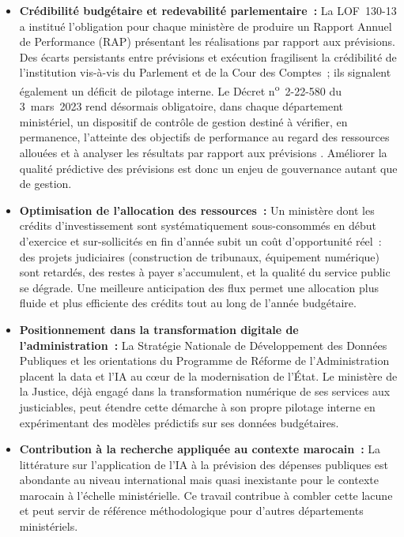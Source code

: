 \begin{itemize}
    \item \textbf{Cr\'edibilit\'e budg\'etaire et redevabilit\'e parlementaire~:}
    La LOF~130-13 a institu\'e l'obligation pour chaque minist\`ere de produire un Rapport Annuel de Performance (RAP) pr\'esentant les r\'ealisations par rapport aux pr\'evisions. Des \'ecarts persistants entre pr\'evisions et ex\'ecution fragilisent la cr\'edibilit\'e de l'institution vis-\`a-vis du Parlement et de la Cour des Comptes~; ils signalent \'egalement un d\'eficit de pilotage interne. Le D\'ecret n\textsuperscript{o}~2-22-580 du 3~mars~2023 rend d\'esormais obligatoire, dans chaque d\'epartement minist\'eriel, un dispositif de contr\^ole de gestion destin\'e \`a \og{}v\'erifier, en permanence, l'atteinte des objectifs de performance au regard des ressources allou\'ees et \`a analyser les r\'esultats par rapport aux pr\'evisions\fg{} \citep{DecretCDG2023}. Am\'eliorer la qualit\'e pr\'edictive des pr\'evisions est donc un enjeu de gouvernance autant que de gestion.

    \item \textbf{Optimisation de l'allocation des ressources~:}
    Un minist\`ere dont les cr\'edits d'investissement sont syst\'ematiquement sous-consomm\'es en d\'ebut d'exercice et sur-sollicit\'es en fin d'ann\'ee subit un co\^ut d'opportunit\'e r\'eel~: des projets judiciaires (construction de tribunaux, \'equipement num\'erique) sont retard\'es, des restes \`a payer s'accumulent, et la qualit\'e du service public se d\'egrade. Une meilleure anticipation des flux permet une allocation plus fluide et plus efficiente des cr\'edits tout au long de l'ann\'ee budg\'etaire.

    \item \textbf{Positionnement dans la transformation digitale de l'administration~:}
    La Strat\'egie Nationale de D\'eveloppement des Donn\'ees Publiques et les orientations du Programme de R\'eforme de l'Administration placent la data et l'IA au c\oe{}ur de la modernisation de l'\'Etat. Le minist\`ere de la Justice, d\'ej\`a engag\'e dans la transformation num\'erique de ses services aux justiciables, peut \'etendre cette d\'emarche \`a son propre pilotage interne en exp\'erimentant des mod\`eles pr\'edictifs sur ses donn\'ees budg\'etaires.

    \item \textbf{Contribution \`a la recherche appliqu\'ee au contexte marocain~:}
    La litt\'erature sur l'application de l'IA \`a la pr\'evision des d\'epenses publiques est abondante au niveau international mais quasi inexistante pour le contexte marocain \`a l'\'echelle minist\'erielle. Ce travail contribue \`a combler cette lacune et peut servir de r\'ef\'erence m\'ethodologique pour d'autres d\'epartements minist\'eriels.
\end{itemize}

